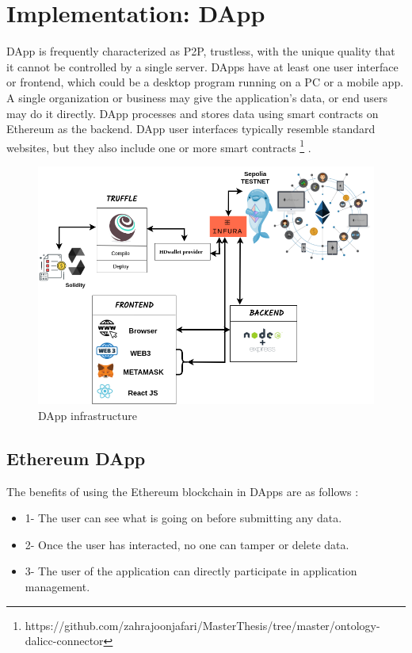 \chapter{Implementation: DApp}
DApp is frequently characterized as P2P, trustless, with the unique quality that it cannot be controlled by a single server. DApps have at least one user interface or frontend, which could be a desktop program running on a PC or a mobile app.
A single organization or business may give the application's data, or end users may do it directly.
DApp processes and stores data using smart contracts on Ethereum as the backend. DApp user interfaces typically resemble standard websites, but they also include one or more smart contracts \footnote{https://github.com/zahrajoonjafari/MasterThesis/tree/master/ontology-dalicc-connector} \cite{William}.

\begin{center}
	
	\begin{figure}[htb!]
		
		\begin{minipage}{0.75\linewidth}
			
			\includegraphics[width=1.45\textwidth]{images/chap03_dapp.png}
		\end{minipage}
		\caption{DApp infrastructure}
		
	\end{figure}
	
\end{center}

\section{Ethereum DApp}
The benefits of using the Ethereum blockchain in DApps are as follows \cite{William}:
\begin{itemize}
    \item 1- The user can see what is going on before submitting any data.
    \item 2- Once the user has interacted, no one can tamper or delete data.
    \item 3- The user of the application can directly participate in application management.
\end{itemize}
